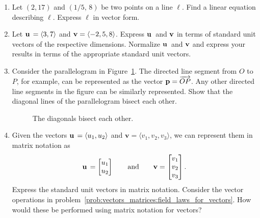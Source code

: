 \begin{enumerate}
\item Let $(2, 17)$ and $(1/5,\, 8)$ be two points on a line
  $\ell$. Find a linear equation describing $\ell$. Express $\ell$ in
  vector form.

\item Let $\operatorname*{\mathbf{u}}{} = \langle 3, 7 \rangle$ and
  $\operatorname*{\mathbf{v}} = \langle -2, 5, 8 \rangle$. Express $\operatorname*{\mathbf{u}}{}$ and $\operatorname*{\mathbf{v}}$ in
  terms of standard unit vectors of the respective
  dimensions. Normalize $\operatorname*{\mathbf{u}}{}$ and $\operatorname*{\mathbf{v}}$ and express your results
  in terms of the appropriate standard unit vectors.

\item Consider the parallelogram in
  Figure~\ref{fig:vectors_matrices:diagonals_bisect}. The directed
  line segment from $O$ to $P$, for example, can be represented as the
  vector $\operatorname*{\mathbf{p}} = \overrightarrow{OP}$. Any other directed line
  segments in the figure can be similarly represented. Show that the
  diagonal lines of the parallelogram bisect each
  other.
%
\begin{figure}[!htpb]
\centering
{}
\caption{The diagonals bisect each other.}
\label{fig:vectors_matrices:diagonals_bisect}
\end{figure}

\item Given the vectors $\operatorname*{\mathbf{u}}{} = \langle u_1, u_2 \rangle$ and
  $\textbf{v} = \langle v_1, v_2, v_3 \rangle$, we can represent them
  in matrix notation as
  \[
  \operatorname*{\mathbf{u}}{} = \begin{bmatrix} u_1 \\ u_2 \end{bmatrix}
  \qquad\text{and}\qquad
  \textbf{v} = \begin{bmatrix} v_1 \\ v_2 \\ v_3 \end{bmatrix}.
  \]
  Express the standard unit vectors in matrix notation. Consider the
  vector operations in
  problem~\ref{prob:vectors_matrices:field_laws_for_vectors}. How
  would these be performed using matrix notation for vectors?


\end{enumerate}
